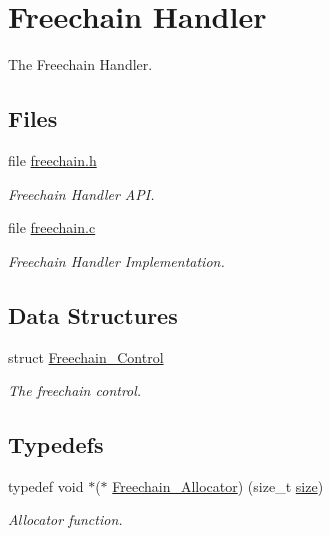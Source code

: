 \hypertarget{group__RTEMSScoreFreechain}{}\section{Freechain Handler}
\label{group__RTEMSScoreFreechain}


The Freechain Handler.  


\subsection*{Files}
\begin{DoxyCompactItemize}
\item 
file \mbox{\hyperlink{freechain_8h}{freechain.\+h}}
\begin{DoxyCompactList}\small\item\em Freechain Handler A\+PI. \end{DoxyCompactList}\item 
file \mbox{\hyperlink{freechain_8c}{freechain.\+c}}
\begin{DoxyCompactList}\small\item\em Freechain Handler Implementation. \end{DoxyCompactList}\end{DoxyCompactItemize}
\subsection*{Data Structures}
\begin{DoxyCompactItemize}
\item 
struct \mbox{\hyperlink{structFreechain__Control}{Freechain\+\_\+\+Control}}
\begin{DoxyCompactList}\small\item\em The freechain control. \end{DoxyCompactList}\end{DoxyCompactItemize}
\subsection*{Typedefs}
\begin{DoxyCompactItemize}
\item 
\mbox{\label{group__RTEMSScoreFreechain_ga1e28d76c4121a3b08517d45eab453ecc}} 
typedef void $\ast$($\ast$ \mbox{\hyperlink{group__RTEMSScoreFreechain_ga1e28d76c4121a3b08517d45eab453ecc}{Freechain\+\_\+\+Allocator}}) (size\+\_\+t \mbox{\hyperlink{sun4u_2tte_8h_a245260f6f74972558f61b85227df5aae}{size}})
\begin{DoxyCompactList}\small\item\em Allocator function. \end{DoxyCompactList}\end{DoxyCompactItemize}
